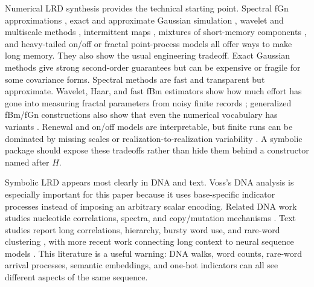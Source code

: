 \documentclass[journal]{IEEEtran}
\begin{document}
Numerical LRD synthesis provides the technical starting point.  Spectral fGn
approximations \cite{paxson1997_fast}, exact and approximate Gaussian simulation
\cite{wood1994_simulation,dietrich1997_fast,dieker2004_simulation,coeurjolly2000_simulation},
wavelet and multiscale methods
\cite{wornell1992_estimation,kaplan1993_fractal,roughan2000_real},
intermittent maps \cite{millan2021_on}, mixtures of short-memory components
\cite{sorbye2017_an}, and heavy-tailed on/off or fractal point-process models
\cite{garrett1994_analysis,lowen1995_estimation,ryu1998_point} all offer ways
to make long memory.  They also show the usual engineering tradeoff.  Exact
Gaussian methods give strong second-order guarantees but can be expensive or
fragile for some covariance forms.  Spectral methods are fast and transparent
but approximate.  Wavelet, Haar, and fast fBm estimators show how much effort
has gone into measuring fractal parameters from noisy finite records
\cite{wornell1992_estimation,kaplan1993_fractal,chang2002_fast}; generalized
fBm/fGn constructions also show that even the numerical vocabulary has variants
\cite{perrin2001_nth}.  Renewal and on/off models are interpretable, but finite
runs can be dominated by missing scales or realization-to-realization
variability \cite{roughan1999_the}.  A symbolic package should expose these
tradeoffs rather than hide them behind a constructor named after \(H\).

Symbolic LRD appears most clearly in DNA and text.  Voss's DNA analysis
\cite{voss1992_evolution} is especially important for this paper because it
uses base-specific indicator processes instead of imposing an arbitrary scalar
encoding.  Related DNA work studies nucleotide correlations, spectra, and
copy/mutation mechanisms
\cite{peng1992_long,li1992_long,li1994_understanding,buldyrev1998_analysis}.
Text studies report long correlations, hierarchy, bursty word use, and rare-word
clustering
\cite{schenkel1993_long,ebeling1994_entropy,montemurro2002_long,alvarez2006_hierarchical,altmann2009_beyond,altmann2012_on,tanaka2016_long},
with more recent work connecting long context to neural sequence models
\cite{belletti2018_factorized,belletti2019_quantifying,tay2021_long}.  This
literature is a useful warning: DNA walks, word counts, rare-word arrival
processes, semantic embeddings, and one-hot indicators can all see different
aspects of the same sequence.
\end{document}
